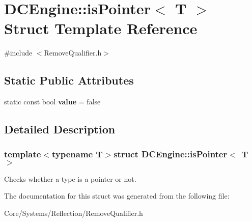 \hypertarget{structDCEngine_1_1isPointer}{\section{D\-C\-Engine\-:\-:is\-Pointer$<$ T $>$ Struct Template Reference}
\label{structDCEngine_1_1isPointer}
}


{\ttfamily \#include $<$Remove\-Qualifier.\-h$>$}

\subsection*{Static Public Attributes}
\begin{DoxyCompactItemize}
\item 
\hypertarget{structDCEngine_1_1isPointer_a198e6d8963b275383c37c0166d82672c}{static const bool {\bfseries value} = false}\label{structDCEngine_1_1isPointer_a198e6d8963b275383c37c0166d82672c}

\end{DoxyCompactItemize}


\subsection{Detailed Description}
\subsubsection*{template$<$typename T$>$struct D\-C\-Engine\-::is\-Pointer$<$ T $>$}

Checks whether a type is a pointer or not. 

The documentation for this struct was generated from the following file\-:\begin{DoxyCompactItemize}
\item 
Core/\-Systems/\-Reflection/Remove\-Qualifier.\-h\end{DoxyCompactItemize}
